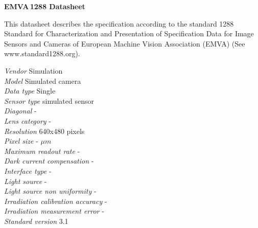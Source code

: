 \documentclass[a4paper,twoside,12pt,american,hidelinks]{article}
\title{}
\author{}
\date{}
\begin{document}
\newcommand{\TheReportSection}{}
\newcommand{\ReportSection}[1]{\renewcommand{\TheReportSection}{#1}}


\newsavebox\wtmkbox
\savebox{}
\newwatermark*[
allpages, angle=45.0, scale=8.0, xpos=-20, ypos=15
]{\usebox\wtmkbox}




\ReportSection{EMVA\,1288 Datasheet}
\pagestyle{fancy}
\scriptsize
\textbf{EMVA\,1288 Datasheet}
\vspace*{5mm}

\begin{minipage}[t]{0.975\linewidth}
This datasheet describes the specification according to the standard 1288
Standard for Characterization and Presentation of Specification Data for
Image Sensors and Cameras of European Machine Vision Association (EMVA)
(See www.standard1288.org).
\end{minipage}
\vspace*{5mm}

\begin{minipage}[t]{0.975\linewidth}
\begin{multicols}{2}
\textsl{Vendor} \hfill Simulation
\\[1mm]
\textsl{Model} \hfill Simulated camera
\\[1mm]
\textsl{Data type} \hfill Single
\\[1mm]
\textsl{Sensor type} \hfill simulated sensor
\\[1mm]
\textsl{Diagonal} \hfill -
\\[1mm]
\textsl{Lens category} \hfill -
\\[1mm]
\textsl{Resolution} \hfill 640x480 pixels
\\[1mm]
\textsl{Pixel size} \hfill - $\mu m$
\\[1mm]\textsl{Maximum readout rate} \hfill  -
\\[1mm]
\textsl{Dark current compensation} \hfill   -
\\[1mm]
\textsl{Interface type} \hfill  -
\\[1mm]
\textsl{Light source} \hfill -
\\[1mm]
\textsl{Light source non uniformity} \hfill -
\\[1mm]
\textsl{Irradiation calibration accuracy} \hfill -
\\[1mm]
\textsl{Irradiation measurement error} \hfill -
\\[1mm]
\textsl{Standard version} \hfill 3.1
\\[1mm]
\end{multicols}
\end{minipage}
\\[5mm]
\end{document}
